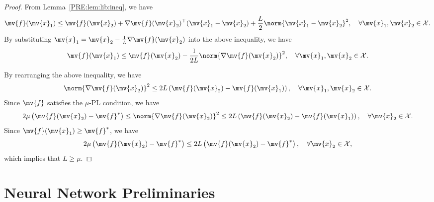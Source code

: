 \begin{proof}

  From Lemma~\ref{PRE:lem:lib:ineq}, we have
  \begin{equation}
    \mv{f}(\mv{x}_1)
    \le 
    \mv{f}(\mv{x}_2)
    +
    \nabla\mv{f}(\mv{x}_2)^\top
    (\mv{x}_1-\mv{x}_2)
    +
    \frac{L}{2}
    \norm{\mv{x}_1-\mv{x}_2}^2
    ,
    \quad\forall \mv{x}_1,\mv{x}_2\in\mathcal{X}
    .
  \end{equation}
  By substituting $\mv{x}_1=\mv{x}_2-\frac{1}{L}\nabla\mv{f}(\mv{x}_2)$ into the above inequality, we have
  \begin{equation}
    \mv{f}(\mv{x}_1)
    \le
    \mv{f}(\mv{x}_2)
    -
    \frac{1}{2L}
    \norm{\nabla\mv{f}(\mv{x}_2)}^2
    ,
    \quad\forall \mv{x}_1,\mv{x}_2\in\mathcal{X}
    .
  \end{equation}

  By rearranging the above inequality, we have
  \begin{equation}
    \norm{\nabla\mv{f}(\mv{x}_2)}^2
    \le
    2L
    \left(
      \mv{f}(\mv{x}_2) - \mv{f}(\mv{x}_1)
    \right)
    ,
    \quad\forall \mv{x}_1,\mv{x}_2\in\mathcal{X}
    .
  \end{equation}
  Since $\mv{f}$ satisfies the $\mu$-PL condition, we have
  \begin{equation}
    2\mu
    \left(
      \mv{f}(\mv{x}_2) - \mv{f}^*
    \right)
    \le
    \norm{\nabla\mv{f}(\mv{x}_2)}^2
    \le
    2L
    \left(
      \mv{f}(\mv{x}_2) - \mv{f}(\mv{x}_1)
    \right)
    ,
    \quad\forall \mv{x}_2\in\mathcal{X}
    .
  \end{equation}
  Since $\mv{f}(\mv{x}_1)\ge \mv{f}^*$, we have
  \begin{equation}
    2\mu
    \left(
      \mv{f}(\mv{x}_2) - \mv{f}^*
    \right)
    \le
    2L
    \left(
      \mv{f}(\mv{x}_2) - \mv{f}^*
    \right)
    ,
    \quad\forall \mv{x}_2\in\mathcal{X}
    ,
  \end{equation}
  which implies that $L\ge \mu$.

\end{proof}

\section{Neural Network Preliminaries}
\label{PRE:sec:NN}

